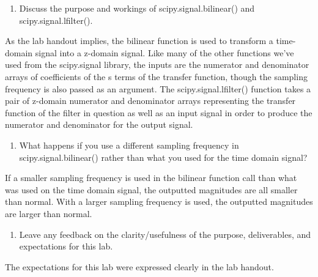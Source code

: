 \documentclass[12pt]{article}
\begin{document}
\begin{enumerate}[resume]
    \item Discuss the purpose and workings of scipy.signal.bilinear() and scipy.signal.lfilter().
\end{enumerate}
    \par As the lab handout implies, the bilinear function is used to transform a time-domain signal into a z-domain signal. Like many of the other functions we've used from the scipy.signal library, the inputs are the numerator and denominator arrays of coefficients of the s terms of the transfer function, though the sampling frequency is also passed as an argument. The scipy.signal.lfilter() function takes a pair of z-domain numerator and denominator arrays representing the transfer function of the filter in question as well as an input signal in order to produce the numerator and denominator for the output signal.
    
\begin{enumerate}[resume]
    \item What happens if you use a different sampling frequency in scipy.signal.bilinear() rather than what you used for the time domain signal?
\end{enumerate}
    \par If a smaller sampling frequency is used in the bilinear function call than what was used on the time domain signal, the outputted magnitudes are all smaller than normal. With a larger sampling frequency is used, the outputted magnitudes are larger than normal.
    
\begin{enumerate}[resume]
    \item Leave any feedback on the clarity/usefulness of the purpose, deliverables, and expectations for this lab.
\end{enumerate}
    \par The expectations for this lab were expressed clearly in the lab handout.
\end{document}
